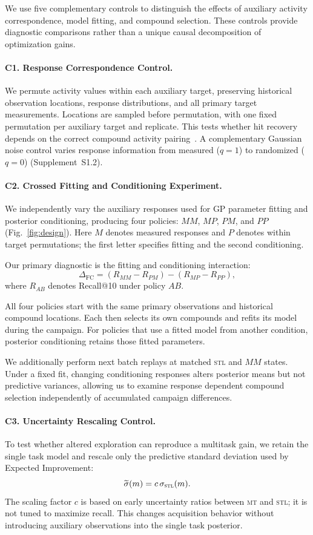 \documentclass[10pt,letterpaper,runningheads]{llncs}
\newcommand{\stl}{\textsc{stl}}
\newcommand{\mt}{\textsc{mt}}
\begin{document}
We use five complementary controls to distinguish the
effects of auxiliary activity correspondence, model
fitting, and compound selection. These controls provide
diagnostic comparisons rather than a unique causal
decomposition of optimization gains.

\paragraph{C1. Response Correspondence Control.}
We permute activity values within each auxiliary target,
preserving historical observation locations, response
distributions, and all primary target measurements.
Locations are sampled before permutation, with one
fixed permutation per auxiliary target and replicate.
This tests whether hit recovery depends on the correct
compound activity pairing~\cite{rucker2007yrandomization,lindgren1996permutation}. A complementary
Gaussian noise control varies response information
from measured ($q=1$) to randomized ($q=0$)
(Supplement~S1.2).

\paragraph{C2. Crossed Fitting and Conditioning Experiment.}
We independently vary the auxiliary responses used
for GP parameter fitting and posterior conditioning,
producing four policies: $MM$, $MP$, $PM$, and $PP$
(Fig.~\ref{fig:design}). Here $M$ denotes measured
responses and $P$ denotes within target permutations;
the first letter specifies fitting and the second
conditioning.

Our primary diagnostic is the fitting and conditioning
interaction:
\[
\Delta_{\mathrm{FC}}
= (R_{MM}-R_{PM})-(R_{MP}-R_{PP}),
\]
where $R_{AB}$ denotes Recall@10 under policy $AB$.

All four policies start with the same primary observations
and historical compound locations. Each then selects its
own compounds and refits its model during the campaign.
For policies that use a fitted model from another condition,
posterior conditioning retains those fitted parameters.

We additionally perform next batch replays at matched
\stl{} and $MM$ states. Under a fixed fit, changing
conditioning responses alters posterior means but
not predictive variances, allowing us to examine
response dependent compound selection independently
of accumulated campaign differences.

\paragraph{C3. Uncertainty Rescaling Control.}
To test whether altered exploration can reproduce
a multitask gain, we retain the single task model
and rescale only the predictive standard deviation
used by Expected Improvement:
\[
\widetilde{\sigma}(m)
= c\,\sigma_{\stl}(m).
\]
The scaling factor $c$ is based on early
uncertainty ratios between \mt{} and \stl{};
it is not tuned to maximize recall. This changes acquisition behavior
without introducing auxiliary observations into the
single task posterior.
\end{document}
